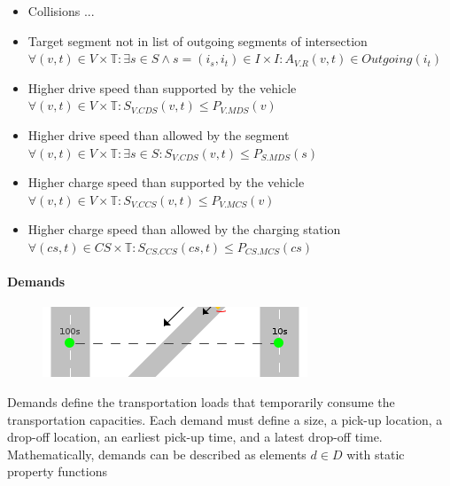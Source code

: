 \documentclass[graybox]{svmult}
\begin{document}
\begin{itemize}
	\item Collisions ...
	\item Target segment not in list of outgoing segments of intersection $\forall (v,t) \in V \times \mathbb{T}: \exists s \in S \wedge s = (i_s, i_t) \in I \times I: A_{V.R}(v, t) \in Outgoing(i_t)$
	
	\item Higher drive speed than supported by the vehicle $\forall (v,t) \in V \times \mathbb{T}: S_{V.CDS}(v,t) \leq P_{V.MDS}(v)$
	\item Higher drive speed than allowed by the segment $\forall (v,t) \in V \times \mathbb{T}: \exists s \in S: S_{V.CDS}(v,t) \leq P_{S.MDS}(s)$
	\item Higher charge speed than supported by the vehicle $\forall (v,t) \in V \times \mathbb{T}: S_{V.CCS}(v,t) \leq P_{V.MCS}(v)$
	\item Higher charge speed than allowed by the charging station $\forall (cs,t) \in CS \times \mathbb{T}: S_{CS.CCS}(cs,t) \leq P_{CS.MCS}(cs)$
\end{itemize}


\paragraph{Demands}
\begin{figure}
	\begin{center}
		\includegraphics[scale=0.5]{../../concepts/demand.png}
	\end{center}
\end{figure}
Demands define the transportation loads that temporarily consume the transportation capacities.
Each demand must define a size, a pick-up location, a drop-off location, an earliest pick-up time, and a latest drop-off time.
Mathematically, demands can be described as elements $d \in D$ with static property functions
\end{document}
